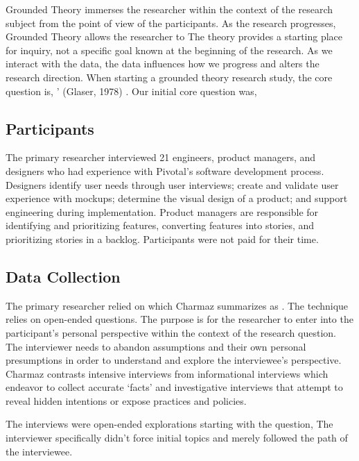 Grounded Theory immerses the researcher within the context of the research subject from the point of view of the participants. As the research progresses, Grounded Theory allows the researcher to  The theory provides a starting place for inquiry, not a specific goal known at the beginning of the research. As we interact with the data, the data influences how we progress and alters the research direction. When starting a grounded theory research study, the core question is, ' (Glaser, 1978) \cite{GlaserTheoreticalSensitivity}. Our initial core question was, 

\subsection{Participants}
The primary researcher interviewed 21 engineers, product managers, and designers who had experience with Pivotal's software development process. Designers identify user needs through user interviews; create and validate user experience with mockups; determine the visual design of a product; and support engineering during implementation. Product managers are responsible for identifying and prioritizing features, converting features into stories, and prioritizing stories in a backlog.  Participants were not paid for their time. 
\subsection{Data Collection}
The primary researcher relied on  which Charmaz summarizes as  \cite{Charmaz}. The technique relies on open-ended questions. The purpose is for the researcher to enter into the participant's personal perspective within the context of the research question. The interviewer needs to abandon assumptions and their own personal presumptions in order to understand and explore the interviewee's perspective. Charmaz \cite{Charmaz} contrasts intensive interviews from informational interviews which endeavor to collect accurate `facts' and investigative interviews that attempt to reveal hidden intentions or expose practices and policies. 
 
The interviews were open-ended explorations starting with the question,  The interviewer specifically didn't force initial topics and merely followed the path of the interviewee. 

